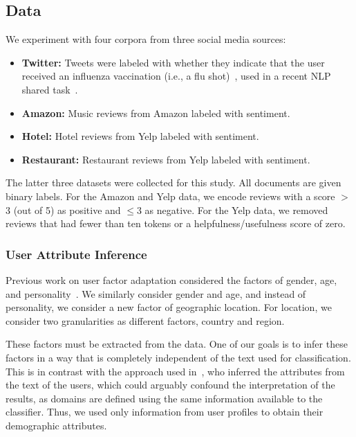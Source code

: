 \subsection{Data}
We experiment with four corpora from three social media sources:
\begin{itemize}
\setlength\itemsep{0ex}
    \item {\bf Twitter:} Tweets were labeled with whether they indicate that the user received an influenza vaccination (i.e., a flu shot)~\cite{huang2017examining},
    used in a recent NLP shared task~\cite{W18-5904}.
    \item {\bf Amazon:} Music reviews from Amazon labeled with sentiment.
    \item {\bf Hotel:} Hotel reviews from Yelp labeled with sentiment.
    \item {\bf Restaurant:} Restaurant reviews from Yelp labeled with sentiment.
\end{itemize}
The latter three datasets were collected for this study.
All documents are given binary labels.
For the Amazon and Yelp data, we encode reviews with a score $>$$3$ (out of 5) as positive and $\leq$$3$ as negative.
For the Yelp data, we removed reviews that had fewer than ten tokens or a helpfulness/usefulness score of zero. 


\subsubsection{User Attribute Inference}

Previous work on user factor adaptation considered the factors of gender, age, and personality~\cite{lynn2017human}.
We similarly consider gender and age, and instead of personality, we consider a new factor of geographic location.
For location, we consider two granularities as different factors, country and region.

These factors must be extracted from the data.
One of our goals is to infer these factors
in a way that is completely independent of the text used for classification.
This is in contrast with the approach used in~\cite{lynn2017human},
who inferred the attributes from the text of the users,
which could arguably confound the interpretation of the results,
as domains are defined using the same information available to the classifier.
Thus, we used only information from user profiles to obtain their demographic attributes.



